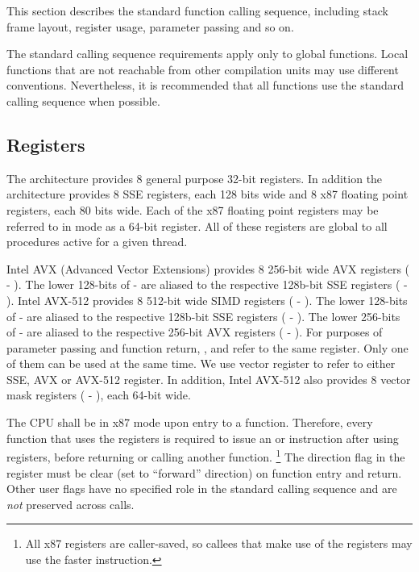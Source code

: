 This section describes the standard function calling sequence,
including stack frame layout, register usage, parameter passing and so
on.

The standard calling sequence requirements apply only to global
functions.  Local functions that are not reachable from other
compilation units may use different conventions.  Nevertheless, it is
recommended that all functions use the standard calling sequence when
possible.

\subsection{Registers}
\label{subsec-registers}

The \xARCH architecture provides 8 general purpose 32-bit registers.
In addition the architecture provides 8 SSE registers, each 128 bits
wide and 8 x87 floating point registers, each 80 bits wide.  Each of
the x87 floating point registers may be referred to in \MMX
mode as a 64-bit register.  All of these registers are global to all
procedures active for a given thread.

Intel AVX (Advanced Vector Extensions) provides 8 256-bit wide AVX registers
( - ).  The lower 128-bits of  - 
are aliased to the respective 128b-bit SSE registers ( -
).  Intel AVX-512 provides 8 512-bit wide SIMD registers
( - ).  The lower 128-bits of  - 
are aliased to the respective 128b-bit SSE registers
( - ).
The lower 256-bits of  - 
are aliased to the respective 256-bit AVX registers
( - ).
For purposes of parameter passing
and function return, ,  and  refer to the
same register. Only one of them can be used at the same time.  We use
vector register to refer to either SSE, AVX or AVX-512 register.  In
addition, Intel AVX-512 also provides 8 vector mask registers (
- ), each 64-bit wide.

The CPU shall be in x87 mode upon entry to a function.  Therefore,
every function that uses the \MMX registers is required to issue an
 or  instruction after using \MMX registers, before
returning or calling another function.  \footnote{All x87 registers
are caller-saved, so callees that make use of the \MMX registers may
use the faster  instruction.}  The direction flag  in the
 register must be clear (set to ``forward'' direction) on function
entry and return.  Other user flags have no specified role in the
standard calling sequence and are {\em not} preserved across calls.

